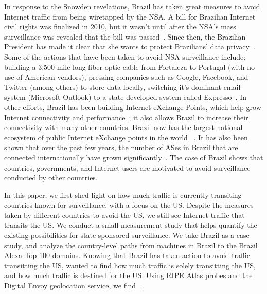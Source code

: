 In response to the Snowden revelations, Brazil has taken great measures to avoid Internet traffic from being wiretapped by the NSA.  A bill for Brazilian Internet civil rights was finalized in 2010, but it wasn't until after the NSA's mass surveillance was revealed that the bill was passed~\cite{brazil_history}.  Since then, the Brazilian President has made it clear that she wants to protect Brazilians' data privacy~\cite{brazil_break_from_US, brazil_conference, brazil_conference2, brazil_human_rights}.  Some of the actions that have been taken to avoid NSA surveillance include: building a 3,500 mile long fiber-optic cable from Fortaleza to Portugal (with no use of American vendors), pressing companies such as Google, Facebook, and Twitter (among others) to store data locally, switching it's dominant email system (Microsoft Outlook) to a state-developed system called Expresso~\cite{brazil_cable, brazil_us_companies}.  In other efforts, Brazil has been building Internet eXchange Points, which help grow Internet connectivity and performance~\cite{brazil_IXP1, brazil_IXP2}; it also allows Brazil to increase their connectivity with many other countries.  Brazil now has the largest national ecosystem of public Internet eXchange points in the world ~\cite{brazil_largest_IXP}.  It has also been shown that over the past few years, the number of ASes in Brazil that are connected internationally have grown significantly~\cite{brazil_international_ases}.  The case of Brazil shows that countries, governments, and Internet users are motivated to avoid surveillance conducted by other countries.

In this paper, we first shed light on how much traffic is currently transiting countries known for surveillance, with a focus on the US.  Despite the measures taken by different countries to avoid the US, we still see Internet traffic that transits the US.  We conduct a small measurement study that helps quantify the existing possibilities for state-sponsored surveillance.  We take Brazil as a case study, and analyze the country-level paths from machines in Brazil to the Brazil Alexa Top 100 domains.  Knowing that Brazil has taken action to avoid traffic transitting the US, wanted to find how much traffic is solely transitting the US, and how much traffic is destined for the US.  Using RIPE Atlas probes and the Digital Envoy geolocation service, we find ~\cite{ripe_atlas, digital_envoy}.  

